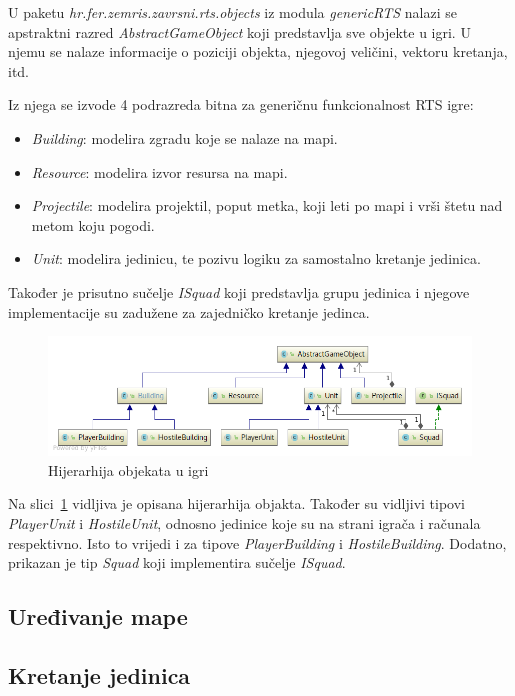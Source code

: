 \documentclass[times, utf8, zavrsni, numeric]{fer}
\begin{document}
\par U paketu \textit{hr.fer.zemris.zavrsni.rts.objects} iz modula \textit{genericRTS} nalazi se apstraktni razred \textit{AbstractGameObject} koji predstavlja sve objekte u igri.
U njemu se nalaze informacije o poziciji objekta, njegovoj veličini, vektoru kretanja, itd.

\par Iz njega se izvode 4 podrazreda bitna za generičnu funkcionalnost RTS igre:
\begin{itemize}
	\item \textit{Building}: modelira zgradu koje se nalaze na mapi.
	\item \textit{Resource}: modelira izvor resursa na mapi.
	\item \textit{Projectile}: modelira projektil, poput metka, koji leti po mapi i vrši štetu nad metom koju pogodi.
	\item \textit{Unit}: modelira jedinicu, te pozivu logiku za samostalno kretanje jedinica. 
\end{itemize}
Također je prisutno sučelje \textit{ISquad} koji predstavlja grupu jedinica i njegove implementacije su zadužene za zajedničko kretanje jedinca.

\begin{figure}[h]
	\centering
	\includegraphics[width=0.8\linewidth]{images/uml_objects.png}
	\caption{Hijerarhija objekata u igri}
	\label{fig:uml_objects}
\end{figure}

\par Na slici~\ref{fig:uml_objects} vidljiva je opisana hijerarhija objakta.
Također su vidljivi tipovi \textit{PlayerUnit} i \textit{HostileUnit}, odnosno jedinice koje su na strani igrača i računala respektivno.
Isto to vrijedi i za tipove \textit{PlayerBuilding} i \textit{HostileBuilding}.
Dodatno, prikazan je tip \textit{Squad} koji implementira sučelje \textit{ISquad}.

\subsection{Uređivanje mape}

\subsection{Kretanje jedinica}
\end{document}
